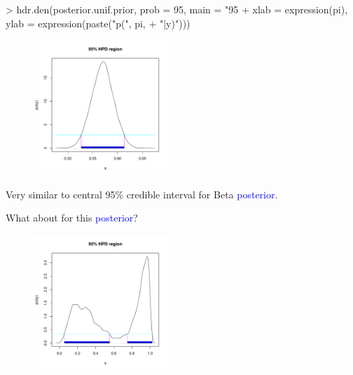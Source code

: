 \documentclass{beamer}
\begin{document}
\begin{frame}[fragile]
\tiny
\begin{Schunk}
\begin{Sinput}
> hdr.den(posterior.unif.prior, prob = 95, main = "95%
+     xlab = expression(pi), ylab = expression(paste("p(", pi, 
+         "|y)")))
\end{Sinput}
\end{Schunk}
\begin{figure}[!htp]
\begin{center}
\includegraphics[width = 2in, height = 2in]{summarize-hpd1.pdf}
\end{center}
\end{figure}
\pause
\normalsize
Very similar to central 95\% credible interval for Beta \textcolor{blue}{posterior}.
\end{frame}

\begin{frame}
What about for this \textcolor{blue}{posterior}?
\begin{figure}[!htp]
\begin{center}
\includegraphics[width = 2in, height = 2in]{summarize-hpd2.pdf}
\end{center}
\end{figure}
\end{frame}
\end{document}

